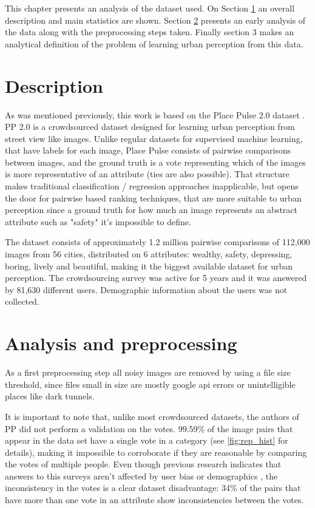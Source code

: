 This chapter presents an analysis of the dataset used. On Section \ref{sec:dataset_desc} an overall description
and main statistics are shown. Section \ref{sec:dataset_prep} presents an early analysis of the data along with
the preprocessing steps taken. Finally section 3 makes an analytical definition of the problem
of learning urban perception from this data.


\section{Description}
\label{sec:dataset_desc}
As was mentioned previously, this work is based on the Place Pulse 2.0 dataset \cite{hidalgo_placepulse}.
PP 2.0 is a crowdsourced dataset designed for learning urban perception from street view like images.
Unlike regular datasets for supervised machine learning, that have labels for each image, Place Pulse
consists of pairwise comparisons between images, and the ground truth is a vote representing which of
the images is more representative of an attribute (ties are also possible). That structure makes
traditional classification / regression approaches inapplicable, but opens the door for
pairwise based ranking techniques, that are more suitable to urban perception since a ground truth for
how much an image represents an abstract attribute such as "safety" it's impossible to define.

The dataset consists of approximately 1.2 million pairwise comparisons of 112,000 images from 56 cities,
distributed on 6 attributes: wealthy, safety, depressing, boring, lively and beautiful, making it
the biggest available dataset for urban perception. The crowdsourcing survey was
active for 5 years and it was answered by 81,630 different users. Demographic information
about the users was not collected.

\section{Analysis and preprocessing}
\label{sec:dataset_prep}

As a first preprocessing step all noisy images are removed by using a file size threshold,
since files small in size are mostly  google api errors or unintelligible places like
dark tunnels.

It is important to note that, unlike most crowdsourced datasets, the authors of PP did not
perform a validation on the votes. 99.59\% of the image pairs that appear in the
data set have a single vote in a category (see \ref{fig:rep_hist} for details),
making it impossible to corroborate if they are reasonable by comparing the votes of multiple people.
Even though previous research indicates that answers to this surveys aren't affected by user
bias or demographics \cite{hidalgo_inequality, costa_lisbon}, the inconsistency in the votes is a
clear dataset disadvantage: 34\% of the  pairs that have more than one vote in an attribute
show inconsistencies between the votes.


